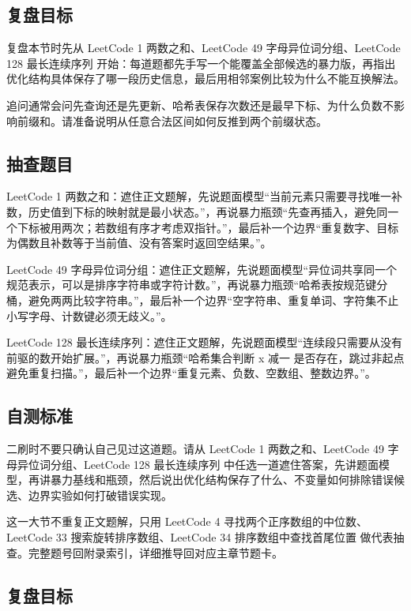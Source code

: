 \subsection{复盘目标}

复盘本节时先从 LeetCode 1 两数之和、LeetCode 49 字母异位词分组、LeetCode 128 最长连续序列 开始：每道题都先手写一个能覆盖全部候选的暴力版，再指出优化结构具体保存了哪一段历史信息，最后用相邻案例比较为什么不能互换解法。

追问通常会问先查询还是先更新、哈希表保存次数还是最早下标、为什么负数不影响前缀和。请准备说明从任意合法区间如何反推到两个前缀状态。

\subsection{抽查题目}

LeetCode 1 两数之和：遮住正文题解，先说题面模型“当前元素只需要寻找唯一补数，历史值到下标的映射就是最小状态。”，再说暴力瓶颈“先查再插入，避免同一个下标被用两次；若数组有序才考虑双指针。”，最后补一个边界“重复数字、目标为偶数且补数等于当前值、没有答案时返回空结果。”。

LeetCode 49 字母异位词分组：遮住正文题解，先说题面模型“异位词共享同一个规范表示，可以是排序字符串或字符计数。”，再说暴力瓶颈“哈希表按规范键分桶，避免两两比较字符串。”，最后补一个边界“空字符串、重复单词、字符集不止小写字母、计数键必须无歧义。”。

LeetCode 128 最长连续序列：遮住正文题解，先说题面模型“连续段只需要从没有前驱的数开始扩展。”，再说暴力瓶颈“哈希集合判断 x 减一 是否存在，跳过非起点避免重复扫描。”，最后补一个边界“重复元素、负数、空数组、整数边界。”。

\subsection{自测标准}

二刷时不要只确认自己见过这道题。请从 LeetCode 1 两数之和、LeetCode 49 字母异位词分组、LeetCode 128 最长连续序列 中任选一道遮住答案，先讲题面模型，再讲暴力基线和瓶颈，然后说出优化结构保存了什么、不变量如何排除错误候选、边界实验如何打破错误实现。

这一大节不重复正文题解，只用 LeetCode 4 寻找两个正序数组的中位数、LeetCode 33 搜索旋转排序数组、LeetCode 34 排序数组中查找首尾位置 做代表抽查。完整题号回附录索引，详细推导回对应主章节题卡。

\subsection{复盘目标}

